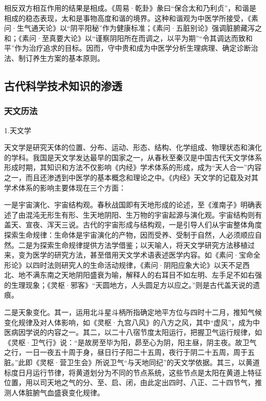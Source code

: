 \documentclass[draft,12pt]{ctexbook}
\begin{document}
相反双方相互作用的结果是相成。《周易·乾卦》彖曰“保合太和乃利贞”，和谐是相成的稳态表现，太和是事物高度和谐的境界。这种和谐观为中医学所接受，《素问·生气通天论》以“阴平阳秘”作为健康标准；《素问·五脏别论》强调脏腑藏泻之和；《素问·至真要大论》以“谨察阴阳所在而调之，以平为期”“令其调达而致和平”作为治疗追求的目标。因而，守中贵和成为中医学分析生理病理、确定诊断治法、制订养生方案的基本原则。

\subsection{古代科学技术知识的渗透} %

\subsubsection{天文历法}%

1.天文学

天文学是研究天体的位置、分布、运动、形态、结构、化学组成、物理状态和演化的学科。我国是天文学发达最早的国家之一，从春秋至秦汉是中国古代天文学体系形成时期，其知识和方法不仅影响《内经》学术体系的形成，成为“天人合一”内容之一，而且还渗透到中医学的基本概念和理论之中。《内经》天文学的记载及对其学术体系的影响主要体现在三个方面：

一是宇宙演化、宇宙结构观。春秋战国即有天地形成的论述，至《淮南子》明确表述了由混沌无形生有形、生天地阴阳、生万物的宇宙起源与演化观。宇宙结构则有盖天、宣夜、浑天三说。古代的宇宙形成与结构观，一是引导人们从宇宙整体角度探索生命规律：生命体是宇宙演化的产物，因而受养、受制于自然，人必须顺应自然。二是为探索生命规律提供方法学借鉴；以天喻人，将天文学研究方法移植过来，变为医学的研究方法，甚至借用天文学术语表述医学内容。如《素问·宝命全形论》以四时法则研究人的生命活动规律，《素问·阴阳应象大论》以天不足西北、地不满东南之天地阴阳盛衰为喻，解释人的右耳目不如左明、左手足不如右强的生理现象；《灵枢·邪客》“天圆地方，人头圆足方以应之。”则是古代盖天说的遗痕。

二是天象变化。其一，运用北斗星斗柄所指确定地平方位与四时十二月，推知气候变化规律及对人体影响，如《灵枢·九宫八风》的八方之风，其中“虚风”，成为中医病因学说的内容之一。其二，以二十八宿节度太阳运行，把握卫气运行规律，如《灵枢·卫气行》说：“是故房至毕为阳，昴至心为阴，阳主昼，阴主夜。故卫气之行，一日一夜五十周于身，昼日行子阳二十五周，夜行于阴二十五周，周于五脏。”此即《灵枢·营卫生会》所说卫气“与天地同纪”的天文学依据。其三，以黄道标度日月运行节律，将黄道划分为不同的节点系统，这些节点是太阳在黄道上特征位置，用以司天地之气的分、至、启、闭，由此定出四时、八正、二十四节气，推测人体脏腑气血盛衰变化规律。
\end{document}
